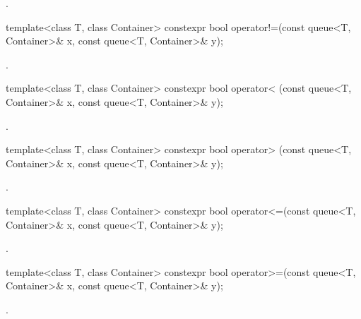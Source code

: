 \begin{itemdescr}
\pnum
\returns
{}.
\end{itemdescr}

%
\begin{itemdecl}
template<class T, class Container>
  constexpr bool operator!=(const queue<T, Container>& x,  const queue<T, Container>& y);
\end{itemdecl}

\begin{itemdescr}
\pnum
\returns
{}.
\end{itemdescr}

%
\begin{itemdecl}
template<class T, class Container>
  constexpr bool operator< (const queue<T, Container>& x, const queue<T, Container>& y);
\end{itemdecl}

\begin{itemdescr}
\pnum
\returns
{}.
\end{itemdescr}

%
\begin{itemdecl}
template<class T, class Container>
  constexpr bool operator> (const queue<T, Container>& x, const queue<T, Container>& y);
\end{itemdecl}

\begin{itemdescr}
\pnum
\returns
{}.
\end{itemdescr}

%
\begin{itemdecl}
template<class T, class Container>
  constexpr bool operator<=(const queue<T, Container>& x, const queue<T, Container>& y);
\end{itemdecl}

\begin{itemdescr}
\pnum
\returns
{}.
\end{itemdescr}

%
\begin{itemdecl}
template<class T, class Container>
  constexpr bool operator>=(const queue<T, Container>& x, const queue<T, Container>& y);
\end{itemdecl}

\begin{itemdescr}
\pnum
\returns
{}.
\end{itemdescr}

